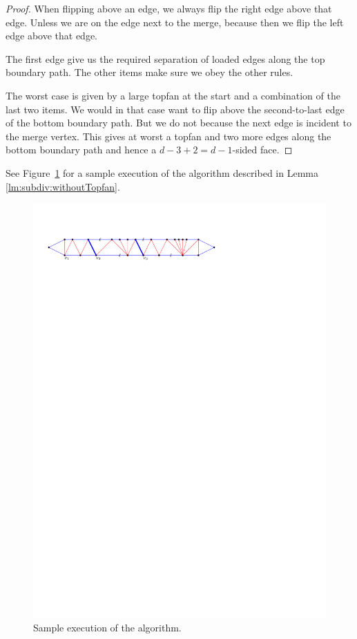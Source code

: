 \begin{proof}
  When flipping above an edge, we always flip the right edge above that edge. Unless we are on the edge next to the merge, because then we flip the left edge above that edge.

  The first edge give us the required separation of loaded edges along the top boundary path. The other items make sure we obey the other rules.

  The worst case is given by a large topfan at the start and  a combination of the last two items. We would in that case want to flip above the second-to-last edge of the bottom boundary path. But we do not because the next edge is incident to the merge vertex. This gives at worst a topfan and  two more edges along the bottom boundary path and hence a $ d - 3 +2 = d -1$-sided face.
  \end{proof}

  See Figure~\ref{fig:subdiv:sampleExecution} for a sample execution of the algorithm described in Lemma \ref{lm:subdiv:withoutTopfan}.

  \begin{figure}[t]
    \centering
    \includegraphics[scale=1]{blueFaceSubdivision/img/sampleExecution}
    \caption{Sample execution of the algorithm.}
    \label{fig:subdiv:sampleExecution}
  \end{figure}

